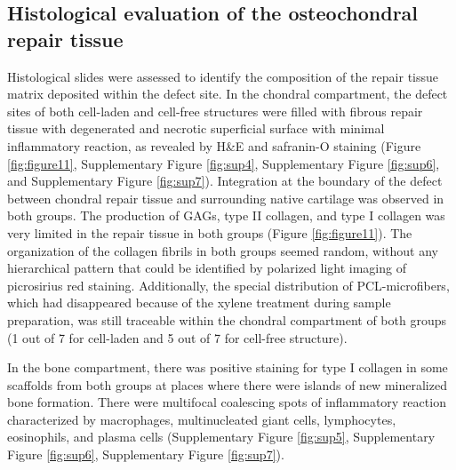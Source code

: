 \documentclass[twocolumn, empirical, authordate, issue]{jote-new-article}
\begin{document}
\subsection{Histological evaluation of the osteochondral repair tissue} 

Histological slides were assessed to identify the composition of the repair tissue matrix deposited within the defect site. In the chondral compartment, the defect sites of both cell-laden and cell-free structures were filled with fibrous repair tissue with degenerated and necrotic superficial surface with minimal inflammatory reaction, as revealed by H\&E and safranin-O staining (Figure \ref{fig:figure11}, Supplementary Figure \ref{fig:sup4}, Supplementary Figure \ref{fig:sup6}, and Supplementary Figure \ref{fig:sup7}). Integration at the boundary of the defect between chondral repair tissue and surrounding native cartilage was observed in both groups. The production of GAGs, type II collagen, and type I collagen was very limited in the repair tissue in both groups (Figure \ref{fig:figure11}). The organization of the collagen fibrils in both groups seemed random, without any hierarchical pattern that could be identified by polarized light imaging of picrosirius red staining. Additionally, the special distribution of PCL-microfibers, which had disappeared because of the xylene treatment during sample preparation, was still traceable within the chondral compartment of both groups (1 out of 7 for cell-laden and 5 out of 7 for cell-free structure).

In the bone compartment, there was positive staining for type I collagen in some scaffolds from both groups at places where there were islands of new mineralized bone formation. There were multifocal coalescing spots of inflammatory reaction characterized by macrophages, multinucleated giant cells, lymphocytes, eosinophils, and plasma cells (Supplementary Figure \ref{fig:sup5}, Supplementary Figure \ref{fig:sup6}, Supplementary Figure \ref{fig:sup7}).
\end{document}
